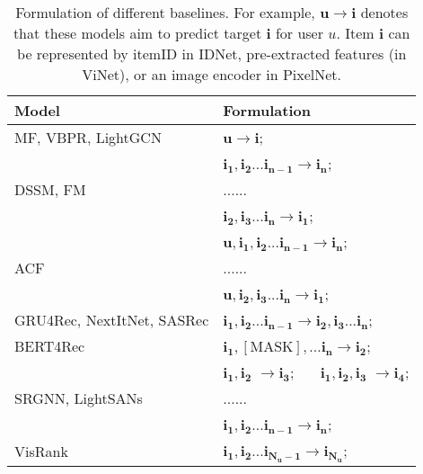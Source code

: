 \documentclass[sigconf]{acmart}
\begin{document}
\begin{table}[t]
	\centering
	\caption{Formulation of different baselines. For example, $\mathbf{u} \rightarrow \mathbf{i}$  denotes that these models aim to predict target $\mathbf{i}$ for user $u$. Item $\mathbf{i}$ can be represented by itemID in IDNet, pre-extracted features (in ViNet), or an image encoder in PixelNet.}	
	\label{tab:dataprocess}
		\begin{tabular}{ l l }
			\toprule
			Model &  Formulation   \\
			\midrule
			MF, VBPR,   LightGCN &  $\mathbf{u} \rightarrow\mathbf{i} $; \\
			
			\midrule
			\multirow{3}{*}{DSSM, FM} & $\mathbf{i_1}, \mathbf{i_2} ...\mathbf{i_{n-1}} \rightarrow \mathbf{i_n} $;    \\
			& ...... \\
			& $\mathbf{i_2}, \mathbf{i_3} ...\mathbf{i_{n}} \rightarrow \mathbf{i_1} $; \\
\midrule
			\multirow{3}{*}{ACF}& $\mathbf{u}, \mathbf{i_1}, \mathbf{i_2} ...\mathbf{i_{n-1}} \rightarrow \mathbf{i_n} $; \\
			& ...... \\
			& $\mathbf{u}, \mathbf{i_2}, \mathbf{i_3} ...\mathbf{i_{n}} \rightarrow \mathbf{i_1} $;\\
			\midrule
			GRU4Rec, NextItNet, SASRec   & $\mathbf{i_1}, \mathbf{i_2} ... \mathbf{i_{n-1}} \rightarrow \mathbf{i_2}, \mathbf{i_3}...\mathbf{i_n} $; \\
			\midrule
			BERT4Rec&  $\mathbf{i_1}, [\text{MASK}], ...\mathbf{i_{n}} \rightarrow  \mathbf{i_2}$; \\
			
			\midrule
			\multirow{3}{*}{SRGNN, LightSANs} &  $\mathbf{i_1}, \mathbf{i_2}$ $\rightarrow \mathbf{i_3} $; \ \  \  $\mathbf{i_1}, \mathbf{i_2}, \mathbf{i_3}$ $\rightarrow \mathbf{i_4} $;  \\
			& ...... \\
			& $\mathbf{i_1}, \mathbf{i_2} ...\mathbf{i_{n-1}} \rightarrow \mathbf{i_n} $; \\
			\midrule
			VisRank&  $\mathbf{i_1}, \mathbf{i_2} ...\mathbf{i_{N_u-1}} \rightarrow \mathbf{i_{N_u}} $; \\
			
			\bottomrule
		\end{tabular}
\end{table}	
\end{document}

